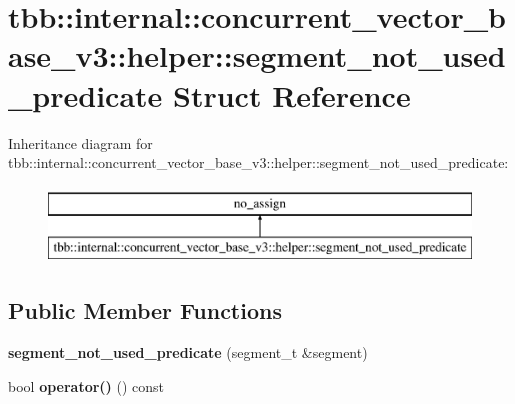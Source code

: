 \hypertarget{structtbb_1_1internal_1_1concurrent__vector__base__v3_1_1helper_1_1segment__not__used__predicate}{}\section{tbb\+:\+:internal\+:\+:concurrent\+\_\+vector\+\_\+base\+\_\+v3\+:\+:helper\+:\+:segment\+\_\+not\+\_\+used\+\_\+predicate Struct Reference}
\label{structtbb_1_1internal_1_1concurrent__vector__base__v3_1_1helper_1_1segment__not__used__predicate}
Inheritance diagram for tbb\+:\+:internal\+:\+:concurrent\+\_\+vector\+\_\+base\+\_\+v3\+:\+:helper\+:\+:segment\+\_\+not\+\_\+used\+\_\+predicate\+:\begin{figure}[H]
\begin{center}
\leavevmode
\includegraphics[height=2.000000cm]{structtbb_1_1internal_1_1concurrent__vector__base__v3_1_1helper_1_1segment__not__used__predicate}
\end{center}
\end{figure}
\subsection*{Public Member Functions}
\begin{DoxyCompactItemize}
\item 
\hypertarget{structtbb_1_1internal_1_1concurrent__vector__base__v3_1_1helper_1_1segment__not__used__predicate_afaa5884b4a7e533e0d8a5a2fb1066116}{}{\bfseries segment\+\_\+not\+\_\+used\+\_\+predicate} (segment\+\_\+t \&segment)\label{structtbb_1_1internal_1_1concurrent__vector__base__v3_1_1helper_1_1segment__not__used__predicate_afaa5884b4a7e533e0d8a5a2fb1066116}

\item 
\hypertarget{structtbb_1_1internal_1_1concurrent__vector__base__v3_1_1helper_1_1segment__not__used__predicate_aa84d480fe25616c6fd0a114e696d2ae6}{}bool {\bfseries operator()} () const \label{structtbb_1_1internal_1_1concurrent__vector__base__v3_1_1helper_1_1segment__not__used__predicate_aa84d480fe25616c6fd0a114e696d2ae6}

\end{DoxyCompactItemize}
